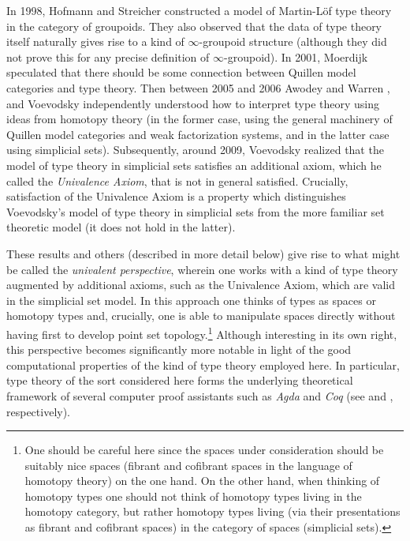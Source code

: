 \documentclass[11pt]{amsart}
\theoremstyle{definition}
\theoremstyle{remark}
\numberwithin{equation}{section}
\begin{document}
In 1998, Hofmann and Streicher \cite{Hofmann:1998ty} constructed a model
of Martin-L\"{o}f type theory in the category of
groupoids.  They also observed that the data of type theory
itself naturally gives rise to a kind of $\infty$-groupoid structure (although they did not prove this for any precise
definition of $\infty$-groupoid).  In 2001, Moerdijk
speculated that there should be some connection between Quillen model
categories and type theory.  Then between 2005 and 2006 Awodey
and Warren \cite{Awodey:2009bz,Warren:2006vf,Warren:2008ts}, and
Voevodsky \cite{Voevodsky:VSNHLC,Voevodsky:2009,Vo2012a,Vo2012} independently understood how to
interpret type theory using ideas from homotopy theory (in the
former case, using the general machinery of Quillen model categories
and weak factorization systems, and in the latter case using
simplicial sets).  Subsequently, around 2009, Voevodsky
\cite{Voevodsky:2009} realized that
the model of type theory in simplicial sets satisfies an additional
axiom, which he called the \emph{Univalence Axiom}, that is not in general
satisfied.  Crucially, satisfaction of the Univalence Axiom is a
property which distinguishes Voevodsky's model of type theory in
simplicial sets from the more familiar set theoretic model (it does
not hold in the latter).

These results and others (described in more detail below) give rise to
what might be called the \emph{univalent perspective}, wherein one
works with a kind of type theory augmented by additional axioms, such as the
Univalence Axiom, which are valid in the simplicial set model.  In
this approach one thinks of types as spaces or homotopy
types and, crucially, one is able to manipulate spaces directly
without having first to develop point set topology.\footnote{One
  should be careful here since the spaces
  under consideration should be suitably nice spaces (fibrant and
  cofibrant spaces in the language of homotopy theory) on the one
  hand.  On the other hand, when thinking of homotopy types one should
  not think of homotopy types living in the homotopy category, but
  rather homotopy types living (via their presentations as fibrant and
  cofibrant spaces) in the category of spaces (simplicial sets).}  Although
interesting in its own right, this perspective becomes significantly
more notable in light of the good computational properties of the
kind of type theory employed here.  In particular, type theory of
the sort considered here forms the underlying theoretical framework
of several computer proof assistants such as \emph{Agda} and
\emph{Coq} (see \cite{Coquand} and \cite{Bertot:2004uj},
respectively).  
\end{document}
